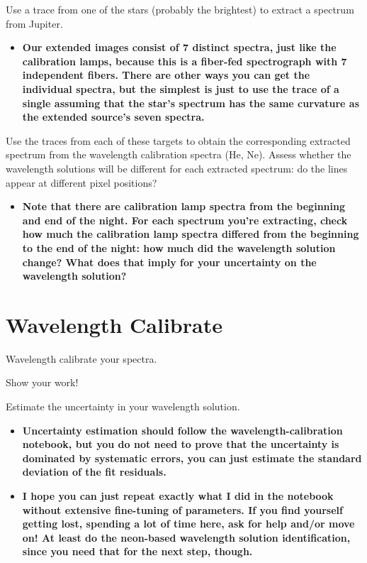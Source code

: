 \documentclass[11pt]{article}
\begin{document}
Use a trace from one of the stars (probably the brightest) to extract a spectrum from Jupiter.
\begin{itemize}
    \item \textbf{Our extended images consist of 7 distinct spectra, just like the
        calibration lamps, because this is a fiber-fed spectrograph with 7
        independent fibers. There are other ways you can get the individual
        spectra, but the simplest is just to use the trace of a single assuming
        that the star's spectrum has the same curvature as the extended source's seven
        spectra.}
\end{itemize}

Use the traces from each of these targets to obtain the corresponding extracted
spectrum from the wavelength calibration spectra (He, Ne).
Assess whether the wavelength solutions will be different for each extracted
spectrum: do the lines appear at different pixel positions?

\begin{itemize}
    \item \textbf{Note that there are calibration lamp spectra from the beginning and end of the night.
        For each spectrum you're extracting, check how much the calibration
        lamp spectra differed from the beginning to the end of the night: how
        much did the wavelength solution change?  What does that imply for your
        uncertainty on the wavelength solution?}
\end{itemize}

\section{Wavelength Calibrate}

Wavelength calibrate your spectra.

Show your work!

Estimate the uncertainty in your wavelength solution.
\begin{itemize}
    \item \textbf{Uncertainty estimation should follow the wavelength-calibration notebook,
        but you do not need to prove that the uncertainty is dominated by systematic errors, you
        can just estimate the standard deviation of the fit residuals.}
    \item \textbf{I hope you can just repeat exactly what I did in the notebook without extensive
        fine-tuning of parameters.  If you find yourself getting lost, spending a lot of time here,
        ask for help and/or move on!  At least do the neon-based wavelength solution identification,
        since you need that for the next step, though.}
\end{itemize}
\end{document}
